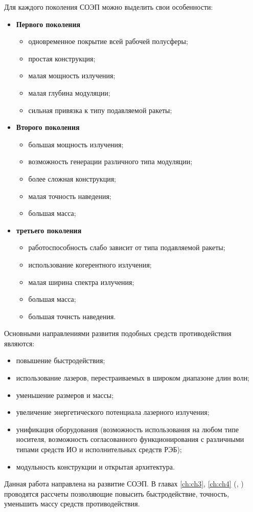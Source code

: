 Для каждого поколения СОЭП можно выделить свои особенности:
\begin{itemize}
	\item \textbf{Первого поколения}
	\begin{itemize}
		\item одновременное покрытие всей рабочей полусферы;
		\item простая конструкция;
		\item малая мощность излучения;
		\item малая глубина модуляции;
		\item сильная привязка к типу подавляемой ракеты;
	\end{itemize}
	\item \textbf{Второго поколения}
	\begin{itemize}
		\item большая мощность излучения;
		\item возможность генерации различного типа модуляции;
		\item более сложная конструкция;
		\item малая точность наведения;
		\item большая масса;
	\end{itemize}
	\item \textbf{третьего поколения}
	\begin{itemize}
		\item работоспособность слабо зависит от типа подавляемой ракеты;
		\item использование когерентного излучения;
		\item малая ширина спектра излучения;
		\item большая масса;
		\item большая точнсть наведения.
	\end{itemize}
\end{itemize}

Основными направлениями развития подобных средств противодействия являются:
\begin{itemize}
	\item повышение быстродействия;
	\item использование лазеров, перестраиваемых в широком диапазоне длин волн;
	\item уменьшение размеров и массы;
	\item увеличение энергетического потенциала лазерного излучения;
	\item унификация оборудования (возможность использования на любом типе носителя, возможность согласованного функционирования с различными типами средств ИО и исполнительных средств РЭБ);
	\item модульность конструкции и открытая архитектура.
\end{itemize}
Данная работа направлена на развитие СОЭП. В главах \ref{ch:ch3}, \ref{ch:ch4} (, ) проводятся рассчеты позволяющие повысить быстродействие, точность, уменьшить массу средств противодействия.

